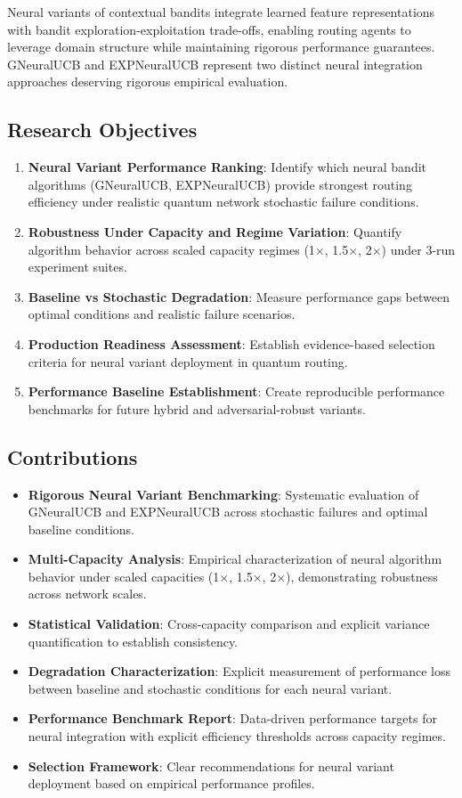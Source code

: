 \documentclass[12pt,a4paper]{article}
\begin{document}
Neural variants of contextual bandits integrate learned feature representations with bandit exploration-exploitation trade-offs, enabling routing agents to leverage domain structure while maintaining rigorous performance guarantees. GNeuralUCB and EXPNeuralUCB represent two distinct neural integration approaches deserving rigorous empirical evaluation.

\subsection{Research Objectives}
\begin{enumerate}
\item \textbf{Neural Variant Performance Ranking}: Identify which neural bandit algorithms (GNeuralUCB, EXPNeuralUCB) provide strongest routing efficiency under realistic quantum network stochastic failure conditions.
\item \textbf{Robustness Under Capacity and Regime Variation}: Quantify algorithm behavior across scaled capacity regimes (1$\times$, 1.5$\times$, 2$\times$) under 3-run experiment suites.
\item \textbf{Baseline vs Stochastic Degradation}: Measure performance gaps between optimal conditions and realistic failure scenarios.
\item \textbf{Production Readiness Assessment}: Establish evidence-based selection criteria for neural variant deployment in quantum routing.
\item \textbf{Performance Baseline Establishment}: Create reproducible performance benchmarks for future hybrid and adversarial-robust variants.
\end{enumerate}

\subsection{Contributions}
\begin{itemize}
\item \textbf{Rigorous Neural Variant Benchmarking}: Systematic evaluation of GNeuralUCB and EXPNeuralUCB across stochastic failures and optimal baseline conditions.
\item \textbf{Multi-Capacity Analysis}: Empirical characterization of neural algorithm behavior under scaled capacities (1$\times$, 1.5$\times$, 2$\times$), demonstrating robustness across network scales.
\item \textbf{Statistical Validation}: Cross-capacity comparison and explicit variance quantification to establish consistency.
\item \textbf{Degradation Characterization}: Explicit measurement of performance loss between baseline and stochastic conditions for each neural variant.
\item \textbf{Performance Benchmark Report}: Data-driven performance targets for neural integration with explicit efficiency thresholds across capacity regimes.
\item \textbf{Selection Framework}: Clear recommendations for neural variant deployment based on empirical performance profiles.
\end{itemize}
\end{document}
